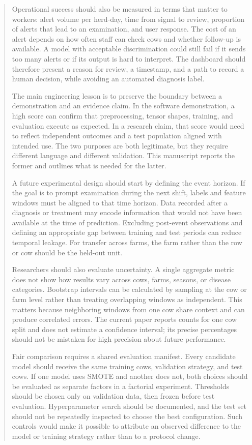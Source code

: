 \documentclass[journal]{IEEEtran}
\begin{document}
\begin{abstract}
Operational success should also be measured in terms that matter to workers: alert volume per herd-day, time from signal to review, proportion of alerts that lead to an examination, and user response. The cost of an alert depends on how often staff can check cows and whether follow-up is available. A model with acceptable discrimination could still fail if it sends too many alerts or if its output is hard to interpret. The dashboard should therefore present a reason for review, a timestamp, and a path to record a human decision, while avoiding an automated diagnosis label.

The main engineering lesson is to preserve the boundary between a demonstration and an evidence claim. In the software demonstration, a high score can confirm that preprocessing, tensor shapes, training, and evaluation execute as expected. In a research claim, that score would need to reflect independent outcomes and a test population aligned with intended use. The two purposes are both legitimate, but they require different language and different validation. This manuscript reports the former and outlines what is needed for the latter.

A future experimental design should start by defining the event horizon. If the goal is to prompt examination during the next shift, labels and feature windows must be aligned to that time horizon. Data recorded after a diagnosis or treatment may encode information that would not have been available at the time of prediction. Excluding post-event observations and defining an appropriate gap between training and test periods can reduce temporal leakage. For transfer across farms, the farm rather than the row or cow should be the held-out unit.

Researchers should also evaluate uncertainty. A single aggregate metric does not show how results vary across cows, farms, seasons, or disease categories. Bootstrap intervals can be calculated by sampling at the cow or farm level rather than treating overlapping windows as independent. This matters because neighboring windows from one cow share context and can produce correlated errors. The current paper reports counts for one cow split and does not estimate a confidence interval; its precise percentages should not be mistaken for high precision about future performance.

Fair comparison requires a shared evaluation manifest. Every candidate model should receive the same training cows, validation strategy, and test cows. If one model uses SMOTE and another does not, both choices should be evaluated as separate factors in a factorial experiment. Thresholds should be chosen only on validation data, then frozen before test evaluation. Hyperparameter search should be documented, and the test set should not be repeatedly inspected to choose the best configuration. Such controls would make it possible to attribute an observed difference to the model or training strategy rather than to a protocol change.


\end{abstract}
\end{document}
